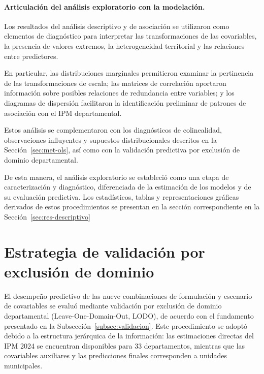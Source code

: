 \paragraph{Articulación del análisis exploratorio con la modelación.}

Los resultados del análisis descriptivo y de asociación se utilizaron como elementos de diagnóstico para interpretar las transformaciones de las covariables, la presencia de valores extremos, la heterogeneidad territorial y las relaciones entre predictores.

En particular, las distribuciones marginales permitieron examinar la pertinencia de las transformaciones de escala; las matrices de correlación aportaron información sobre posibles relaciones de redundancia entre variables; y los diagramas de dispersión facilitaron la identificación preliminar de patrones de asociación con el IPM departamental.

Estos análisis se complementaron con los diagnósticos de colinealidad, observaciones influyentes y supuestos distribucionales descritos en la Sección~\ref{sec:met-ols}, así como con la validación predictiva por exclusión de dominio departamental.

De esta manera, el análisis exploratorio se estableció como una etapa de caracterización y diagnóstico, diferenciada de la estimación de los modelos y de su evaluación predictiva. Los estadísticos, tablas y representaciones gráficas derivados de estos procedimientos se presentan en la sección correspondiente en la Sección~\ref{sec:res-descriptivo}



\section{Estrategia de validación por exclusión de dominio}
\label{sec:met-validacion}

El desempeño predictivo de las nueve combinaciones de formulación y escenario de covariables se evaluó mediante validación por exclusión de dominio departamental (Leave-One-Domain-Out, LODO), de acuerdo con el fundamento presentado en la Subsección~\ref{subsec:validacion}. Este procedimiento se adoptó debido a la estructura jerárquica de la información: las estimaciones directas del IPM 2024 se encuentran disponibles para 33 departamentos, mientras que las covariables auxiliares y las predicciones finales corresponden a unidades municipales.

